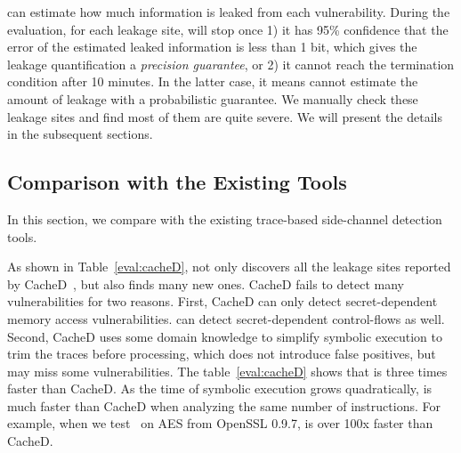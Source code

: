 \tool{} can estimate how
much information is leaked from each vulnerability. During the evaluation,
for each leakage site, \tool{} will stop once 1) it has 95\% confidence
that the error of the estimated leaked information is less than 1 bit,
which gives the leakage quantification a \emph{precision guarantee}, 
or 2) it cannot reach the termination condition after 10 minutes.  In
the latter case, it means \tool{} cannot estimate the amount of leakage with a
probabilistic guarantee.
\label{loc:timeout}
We manually check these  leakage sites and find most of them are quite severe.
We will present the details in the subsequent sections.

\subsection{Comparison with the Existing Tools}
\label{eval:scala}


In this section, we compare \tool{} with the
existing trace-based side-channel detection tools.

As shown in Table~\ref{eval:cacheD},
\tool{} not only discovers all the leakage sites reported by CacheD~\cite{203878}, but also
finds many new ones. CacheD fails to detect many vulnerabilities for two
reasons. First, CacheD can only detect secret-dependent memory access
vulnerabilities. \tool{} can detect secret-dependent control-flows as well.
Second, CacheD uses some domain
knowledge to simplify symbolic execution to trim the traces before
processing, which does not introduce false positives, but may miss some
vulnerabilities. The table~\ref{eval:cacheD} shows that
\tool{} is three times faster than CacheD. As the time of symbolic execution
grows quadratically, \tool{} is much faster than CacheD when analyzing the same
number of instructions. For example, when we test~\tool{} on AES from OpenSSL
0.9.7, \tool{} is over 100x faster than CacheD.

